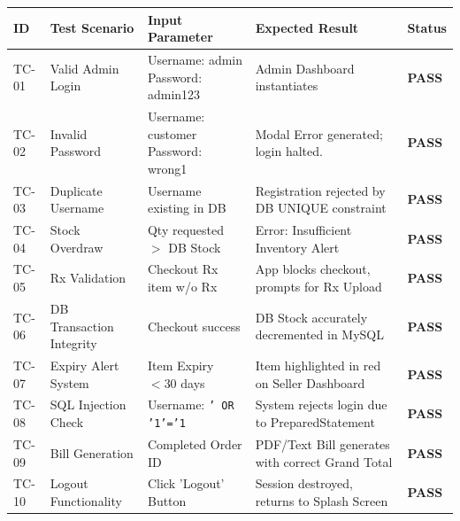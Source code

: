 \documentclass[12pt,a4paper]{report}
\begin{document}
\begin{longtable}{p{1.2cm} p{3.5cm} p{3.5cm} p{4cm} p{1.5cm}}
\toprule
\rowcolor{headerBlue}\color{white}\textbf{ID} & \color{white}\textbf{Test Scenario} & \color{white}\textbf{Input Parameter} & \color{white}\textbf{Expected Result} & \color{white}\textbf{Status} \\
\midrule
\endfirsthead
\rowcolor{rowOdd}  TC-01 & Valid Admin Login & Username: admin \newline Password: admin123 & Admin Dashboard instantiates & \textcolor{pharmaGreen}{\textbf{PASS}} \\
\rowcolor{rowEven} TC-02 & Invalid Password & Username: customer \newline Password: wrong1 & Modal Error generated; login halted. & \textcolor{pharmaGreen}{\textbf{PASS}} \\
\rowcolor{rowOdd}  TC-03 & Duplicate Username & Username existing in DB & Registration rejected by DB UNIQUE constraint & \textcolor{pharmaGreen}{\textbf{PASS}} \\
\rowcolor{rowEven} TC-04 & Stock Overdraw & Qty requested $>$ DB Stock & Error: Insufficient Inventory Alert & \textcolor{pharmaGreen}{\textbf{PASS}} \\
\rowcolor{rowOdd}  TC-05 & Rx Validation & Checkout Rx item w/o Rx & App blocks checkout, prompts for Rx Upload & \textcolor{pharmaGreen}{\textbf{PASS}} \\
\rowcolor{rowEven} TC-06 & DB Transaction Integrity & Checkout success & DB Stock accurately decremented in MySQL & \textcolor{pharmaGreen}{\textbf{PASS}} \\
\rowcolor{rowOdd}  TC-07 & Expiry Alert System & Item Expiry $< 30$ days & Item highlighted in red on Seller Dashboard & \textcolor{pharmaGreen}{\textbf{PASS}} \\
\rowcolor{rowEven} TC-08 & SQL Injection Check & Username: \texttt{' OR '1'='1} & System rejects login due to PreparedStatement & \textcolor{pharmaGreen}{\textbf{PASS}} \\
\rowcolor{rowOdd}  TC-09 & Bill Generation & Completed Order ID & PDF/Text Bill generates with correct Grand Total & \textcolor{pharmaGreen}{\textbf{PASS}} \\
\rowcolor{rowEven} TC-10 & Logout Functionality & Click 'Logout' Button & Session destroyed, returns to Splash Screen & \textcolor{pharmaGreen}{\textbf{PASS}} \\
\bottomrule
\end{longtable}

\clearpage
\end{document}
